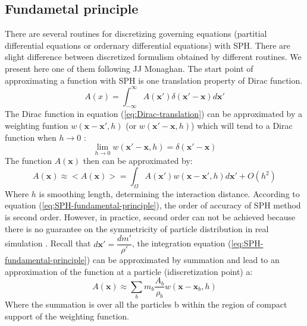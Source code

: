 \documentclass[10pt,a4paper]{article}
\begin{document}
\subsection{Fundametal principle}
There are several routines for discretizing governing equations (partitial differential equations or ordernary differential equations) with SPH. There are slight difference between discretized formulism obtained by different routines. We present here one of them following JJ Monaghan\cite{monaghan1992smoothed, monaghan2005smoothed}. The start point of approximating a function with SPH is one translation property of Dirac function.
\begin{equation}
A(x)=\int_{-\infty}^{\infty} A(\textbf{x} \prime) \delta (\textbf{x} \prime - \textbf{x}) d\textbf{x} \prime
\label{eq:Dirac-translation}
\end{equation}
The Dirac function in equation (\ref{eq:Dirac-translation}) can be approximated by a weighting funtion $w(\textbf{x}-\textbf{x}\prime, h)$ (or $w(\textbf{x}\prime-\textbf{x}, h)$) which will tend to a Dirac function when $h \rightarrow 0$ :
\begin{equation}
\lim _{h \rightarrow 0} w(\textbf{x} \prime-\textbf{x}, h) =  \delta (\textbf{x} \prime - \textbf{x})
\label{eq:SPH_kernel_delta}
\end{equation}
The function $A(\textbf{x})$ then can be approximated by:
\begin{equation}
A(\textbf{x}) \approx <A(\textbf{x})> = \int_{\Omega} A(\textbf{x} \prime) w(\textbf{x}-\textbf{x}\prime, h) d\textbf{x}\prime + O(h^2)
\label{eq:SPH-fundamental-principle}
\end{equation}
Where $h$ is smoothing length, determining the interaction distance. According to equation (\ref{eq:SPH-fundamental-principle}), the order of accuracy of SPH method is second order. However, in practice, second order can not be achieved because there is no guarantee on the symmetricity of particle distribution in real simulation \cite{price2012smoothed}.
Recall that $d\textbf{x}\prime = \dfrac{dm \prime}{\rho \prime}$, the integration equation (\ref{eq:SPH-fundamental-principle}) can be approximated by summation and lead to an approximation of the function at a particle (idiscretization point) a:
\begin{equation}
A(\textbf{x}) \approx \sum_b m_b \dfrac{A_b}{\rho_b} w(\textbf{x}-\textbf{x}_b, h)
\label{eq:SPH-approximation-sum}
\end{equation}
Where the summation is over all the particles b within the region of compact support of the weighting function. 
\end{document}
